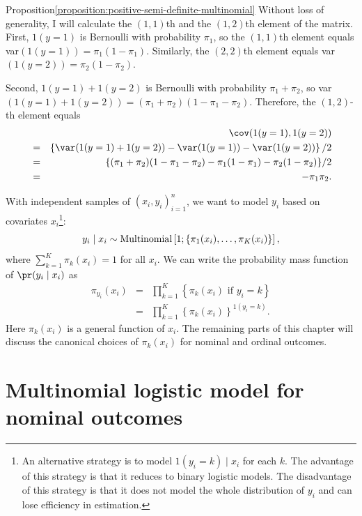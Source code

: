 \begin{myproof}{Proposition}{\ref{proposition:positive-semi-definite-multinomial}}
Without loss of generality, I will calculate the $(1,1)$th and the $(1,2)$th element of the matrix. First, $1(y=1)$ is Bernoulli with probability $\pi_1$, so the $(1,1)$th element equals var$( 1(y=1) ) = \pi_1 (1 - \pi_1)$. Similarly, the $(2,2)$th element equals var$( 1(y=2) ) = \pi_2 (1 - \pi_2)$.

Second, $1(y=1) +1(y=2)$ is Bernoulli with probability $\pi_1 + \pi_2$, so var$(1(y=1) +1(y=2)) = (\pi_1 + \pi_2)(1-\pi_1 -\pi_2)$. Therefore, the $(1,2)$-th element equals
\begin{eqnarray*}
&&\cov(1(y=1), 1(y=2) ) \\
&=& \left\{ \var( 1(y=1) +1(y=2) ) - \var( 1(y=1)) - \var(1(y=2)) \right\} / 2 \\
&=& \{  (\pi_1 + \pi_2)(1-\pi_1 -\pi_2) - \pi_1 (1 - \pi_1) - \pi_2 (1 - \pi_2) \} / 2 \\
&=& -\pi_1 \pi_2.
\end{eqnarray*}  
\end{myproof}



With independent samples of $(x_{i},y_{i})_{i=1}^{n}$, we want to
model $y_{i}$ based on covariates $x_{i}$\footnote{An alternative  strategy is to model $1(y_i=k)\mid x_i$ for each $k$. The advantage of this strategy is that it reduces to binary logistic models. The disadvantage of this strategy is that it does not model the whole distribution of $y_i$ and can lose efficiency in estimation.}:
\[
y_{i}\mid x_{i}\sim\textup{Multinomial}\left[1;\left\{ \pi_{1}(x_{i}),\ldots,\pi_{K}(x_{i})\right\} \right],
\]
where $\sum_{k=1}^{K}\pi_{k}(x_{i})=1$  for all $x_{i}.$
We can write the probability mass function of $\pr( y_{i}\mid x_{i} ) $ as
\begin{eqnarray*}
\pi_{y_i}(x_i) 
&=& 
  \prod_{k=1}^{K}  \left\{   \pi_{k}(x_{i}) \text{ if } y_{i}=k\right\}  \\
&=&  \prod_{k=1}^{K}\left\{ \pi_{k}(x_{i})\right\} ^{1(y_{i}=k) }.
\end{eqnarray*}
Here $\pi_{k}(x_{i} ) $ is a general function of $x_i$. The remaining parts of this chapter will discuss the canonical choices of $\pi_{k}(x_{i} ) $ for nominal and ordinal outcomes. 




\section{Multinomial logistic model for nominal outcomes}

